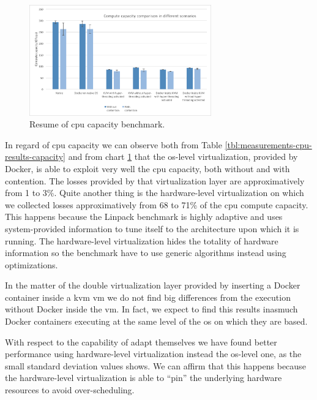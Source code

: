 \begin{figure}
	\centering{}
	\includegraphics[width=0.7\textwidth]{chapters/measurements/images/cpu-capacity.png}
	\caption[Compute - resume of capacity benchmark]{Resume of \acs{cpu} capacity benchmark.}
	\label{img:measurements-cpu-results-capacity}
\end{figure}

In regard of \acs{cpu} capacity we can observe both from Table \ref{tbl:measurements-cpu-results-capacity}
and from chart \ref{img:measurements-cpu-results-capacity} that the \acs{os}-level virtualization,
provided by Docker, is able to exploit very well the \acs{cpu} capacity, both without and with contention.
The losses provided by that virtualization layer are approximatively from 1 to 3\%. Quite another thing is
the  hardware-level virtualization on which we collected losses approximatively from 68 to 71\% of the
\acs{cpu} compute capacity. This happens because the Linpack benchmark is highly adaptive and uses
system-provided information to tune itself to the architecture upon which it is running. The hardware-level
virtualization hides the totality of hardware information so the benchmark have to use generic algorithms
instead using optimizations.

In the matter of the double virtualization layer provided by inserting a Docker container inside a
\ac{kvm} \ac{vm} we do not find big differences from the execution without Docker inside the \ac{vm}.
In fact, we expect to find this results inasmuch Docker containers executing at the same level
of the \acs{os} on which they are based.

With respect to the capability of adapt themselves we have found better performance using
hardware-level virtualization instead the \acs{os}-level one, as the small standard deviation values
shows. We can affirm that this happens because the hardware-level virtualization is able to ``pin''
the underlying hardware resources to avoid over-scheduling.

